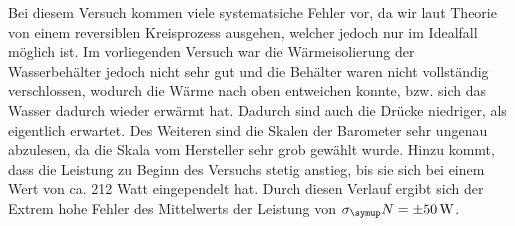 Bei diesem Versuch kommen viele systematsiche Fehler vor, da wir laut Theorie
von einem reversiblen Kreisprozess ausgehen, welcher jedoch nur im Idealfall
möglich ist. Im vorliegenden Versuch war die Wärmeisolierung der Wasserbehälter
jedoch nicht sehr gut und die Behälter waren nicht vollständig verschlossen, wodurch
die Wärme nach oben entweichen konnte, bzw. sich das Wasser dadurch wieder erwärmt hat.
Dadurch sind auch die Drücke niedriger, als eigentlich erwartet.
Des Weiteren sind die Skalen der Barometer sehr ungenau abzulesen, da die Skala vom Hersteller
sehr grob gewählt wurde. Hinzu kommt, dass die Leistung zu Beginn des Versuchs stetig anstieg,
bis sie sich bei einem Wert von ca. 212 Watt eingependelt hat. Durch diesen Verlauf
ergibt sich der Extrem hohe Fehler des Mittelwerts der Leistung von $\sigma_\su{N}
=\pm 50 \,\si{\watt}$.
